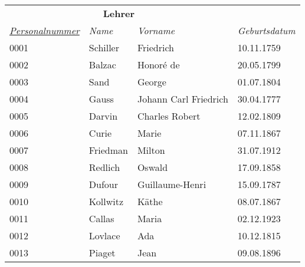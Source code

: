 \documentclass{standalone}
\begin{document}
\begin{tabular}{|l|l|l|l|}
    \hline
    \multicolumn{3}{c}{\cellcolor[HTML]{C0C0C0} \textbf{Lehrer}} \\
    \textit{\underline{Personalnummer}}&
    \textit{Name}&
    \textit{Vorname}&
    \textit{Geburtsdatum} \\ \hline
    0001&Schiller&Friedrich&10.11.1759\\
    0002&Balzac&Honoré de&20.05.1799\\
    0003&Sand&George&01.07.1804\\
    0004&Gauss&Johann Carl Friedrich&30.04.1777\\
    0005&Darvin&Charles Robert&12.02.1809\\
    0006&Curie&Marie&07.11.1867\\
    0007&Friedman&Milton&31.07.1912\\
    0008&Redlich&Oswald&17.09.1858\\
    0009&Dufour&Guillaume-Henri&15.09.1787\\
    0010&Kollwitz&Käthe&08.07.1867\\
    0011&Callas&Maria&02.12.1923\\
    0012&Lovlace&Ada&10.12.1815\\
    0013&Piaget&Jean&09.08.1896\\
    \hline
    \end{tabular}
\end{document}
